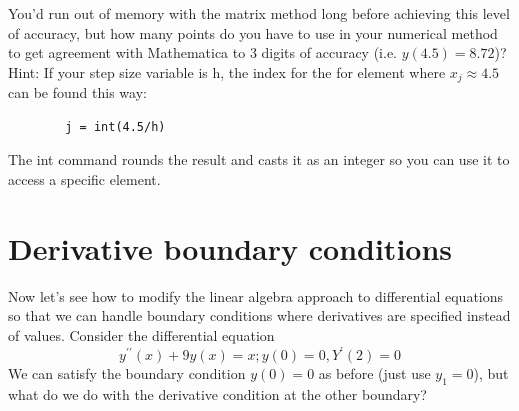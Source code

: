 \documentclass{book}
\theoremstyle{plain}
\theoremstyle{definition}
\numberwithin{exm}{chapter}
\theoremstyle{remark}
\theoremstyle{summary}
\theoremstyle{overview}
\begin{document}
\begin{enumerate}[label=(\alph*)]
	You\rq d run out of memory with the matrix method long before achieving this level of accuracy, but how many points do you have to use in your numerical method to get agreement with Mathematica to 3 digits of accuracy (i.e. $y(4.5) = 8.72$)?		
		\\
		Hint: If your step size variable is h, the index for the for element where
$x_j \approx 4.5$ can be found this way:
	\begin{lstlisting}
		j = int(4.5/h)
	\end{lstlisting}
	The int command rounds the result and casts it as an integer so you can use it to access a specific element.
	\end{enumerate}
	
\section*{Derivative boundary conditions}
	Now let\rq s see how to modify the linear algebra approach to differential equations
so that we can handle boundary conditions where derivatives are specified instead
of values. Consider the differential equation
	\begin{equation}\label{eq:28}
		y^{\prime\prime}(x) + 9y(x) = x   ;    y(0) = 0,    Y^\prime(2) = 0
	\end{equation}
	We can satisfy the boundary condition $y(0) = 0$ as before (just use $y_1 = 0$), but
what do we do with the derivative condition at the other boundary?
\end{document}

